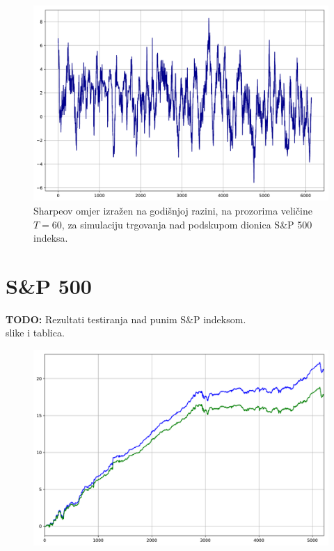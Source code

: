 \documentclass[lmodern, utf8, diplomski, numeric]{fer}
\newcommand{\todo}{\textbf{TODO: }}
\begin{document}
  \begin{figure}[p]
    \centering
    \includegraphics[width=\linewidth]{graphics/sharpe1.pdf}
    \caption{Sharpeov omjer izražen na godišnjoj razini, na prozorima veličine $T = 60$, za simulaciju trgovanja nad podskupom dionica S\&P 500 indeksa.}
    \label{fig:sharpe1}
  \end{figure}

  
  \pagebreak
  
  \section{S\&P 500}
  \todo
  Rezultati testiranja nad punim S\&P indeksom. \\
  slike i tablica.

  \begin{figure}[p]
    \centering
    \includegraphics[width=\linewidth]{graphics/results2.pdf}
    \caption{}
    \label{fig:results2}
  \end{figure}
\end{document}

